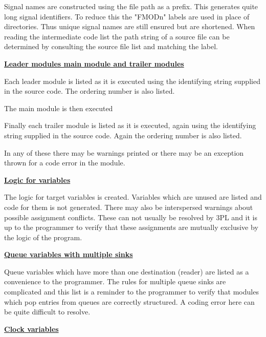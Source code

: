             Signal names are constructed using the file path as a prefix. This
            generates quite long signal identifiers. To reduce this the "FMODn"
            labels are used in place of directories. Thus unique signal names
            are still ensured but are shortened. When reading the intermediate
            code list the path string of a source file can be determined by
            consulting the source file list and matching the label.
        
        {\bf \underline{Leader modules main module and trailer modules}}
        
            Each leader module is listed as it is executed using the identifying
            string supplied in the source code. The ordering number is also
            listed.

            The main module is then executed

            Finally each trailer module is listed as it is executed, again using
            the identifying string supplied in the source code. Again the
            ordering number is also listed.

            In any of these there may be warnings printed or there may be an
            exception thrown for a code error in the module.
            
        {\bf \underline{Logic for variables}}
        
            The logic for target variables is created. Variables which are
            unused are listed and code for them is not generated. There may
            also be interspersed warnings about possible assignment conflicts.
            These can not usually be resolved by 3PL and it is up to the
            programmer to verify that these assignments are mutually exclusive
            by the logic of the program.
            
        {\bf \underline{Queue variables with multiple sinks}}
        
            Queue variables which have more than one destination (reader)
            are listed as a convenience to the programmer. The rules for
            multiple queue sinks are complicated and this list is a reminder
            to the programmer to verify that modules which pop entries from
            queues are correctly structured. A coding error here can be quite
            difficult to resolve.
            
        {\bf \underline{Clock variables}}
        
